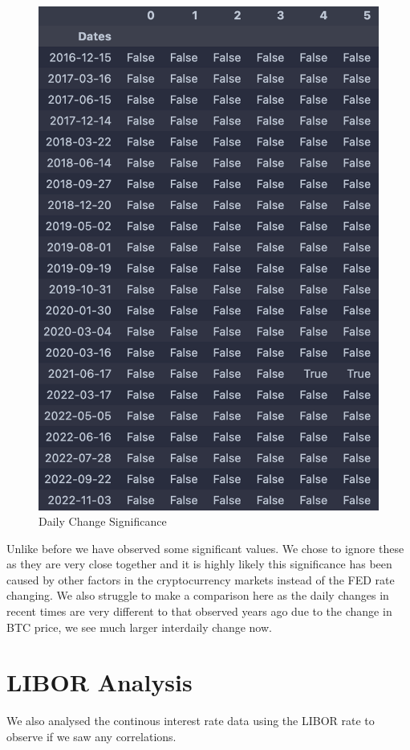\documentclass[12pt]{article}
\begin{document}
\begin{figure}[H]
   \includegraphics[scale=0.7]{research_project/text/paper/10.png}
   \centering
   \caption{Daily Change Significance}
   \label{fig:FED Rate evolution 2016 - 2022}
\end{figure}
Unlike before we have observed some significant values. We chose to ignore these as they are very close together and it is highly likely this significance has been caused by other factors in the cryptocurrency markets instead of the FED rate changing. We also struggle to make a comparison here as the daily changes in recent times are very different to that observed years ago due to the change in BTC price, we see much larger interdaily change now. 

\newpage
\section{LIBOR Analysis}
We also analysed the continous interest rate data using the LIBOR rate to observe if we saw any correlations.\\
\end{document}

